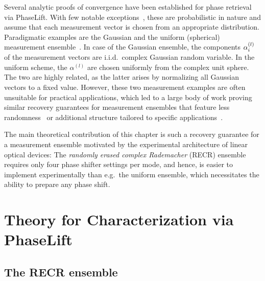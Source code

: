 Several analytic proofs of convergence have been established for phase retrieval via PhaseLift.
With few notable exceptions~\cite{Kech_2016_Explicit}, these are probabilistic in nature and assume that each measurement vector is chosen from an appropriate distribution.
Paradigmatic examples are the Gaussian and the uniform (spherical) measurement ensemble~\cite{Candes_2013_Phaselift}.
In case of the Gaussian ensemble, the components $\alpha^{(l)}_i$ of the measurement vectors are i.i.d.\ complex Gaussian random variable.
In the uniform scheme, the $\alpha^{(l)}$ are chosen uniformly from the complex unit sphere.
The two are highly related, as the latter arises by normalizing all Gaussian vectors to a fixed value.
However, these two measurement examples are often unsuitable for practical applications, which led to a large body of work proving similar recovery guarantees  for measurement ensembles that feature less randomness~\cite{Gross_2014_Partial,Kueng_2014_Low,Kueng_2014_Low,Kueng_2016_Low} or additional structure tailored to specific applications~\cite{Candes_2013_Phaselift,Gross_2017_Improved,Voroninski_2013_Quantum,Kueng_2015_Low}.

The main theoretical contribution of this chapter is such a recovery guarantee for a measurement ensemble motivated by the experimental architecture of linear optical devices:
The \emph{randomly erased complex Rademacher} (RECR) ensemble requires only four phase shifter settings per mode, and hence, is easier to implement experimentally than e.g.\ the uniform ensemble, which necessitates the ability to prepare any phase shift.


\section{Theory for Characterization via PhaseLift}


\subsection{The RECR ensemble}

